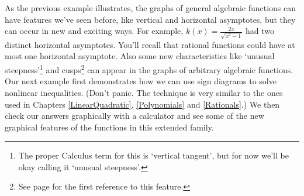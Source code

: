 As the previous example illustrates, the graphs of general algebraic functions can have features we've seen before, like vertical and horizontal asymptotes, but they can occur in new and exciting ways. For example, $k(x) = \frac{2x}{\sqrt{x^{2} - 1}}$ had two distinct horizontal asymptotes.  You'll recall that rational functions could have at most one horizontal asymptote.  Also some new characteristics like `unusual steepness'\footnote{The proper Calculus term for this is `vertical tangent', but for now we'll be okay calling it `unusual steepness'.} and cusps\footnote{See page \pageref{cusppicture} for the first reference to this feature.} can appear in the graphs of arbitrary algebraic functions.   Our next example first demonstrates how we can use sign diagrams to solve nonlinear inequalities. (Don't panic.  The technique is very similar to the ones used in Chapters \ref{LinearQuadratic}, \ref{Polynomials} and \ref{Rationals}.)  We then check our answers graphically with a calculator and see some of the new graphical features of the functions in this extended family.

